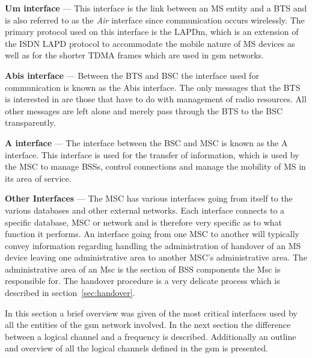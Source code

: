 \begin{description}
  \item{\textbf{Um interface}} --- This interface is the link between an \gls{MS} entity and a \gls{BTS} and is also referred to as the \emph{Air} interface since communication occurs wirelessly. The primary protocol used on this interface is the \gls{LAPDm}, which is an extension of the \gls{ISDN} LAPD protocol to accommodate the mobile nature of \gls{MS} devices as well as for the shorter \gls{TDMA} frames which are used in \gls{gsm} networks\cite{wirelesstelcoMullet,GSMSecurInTeleNetwork}.
\item{\textbf{Abis interface}} --- Between the \gls{BTS} and \gls{BSC} the interface used for communication is known as the Abis interface. The only messages that the \gls{BTS} is interested in are those that have to do with management of radio resources\cite{wirelesstelcoMullet,GSMSecurInTeleNetwork}. All other messages are left alone and merely pass through the \gls{BTS} to the \gls{BSC} transparently.
\item{\textbf{A interface}} --- The interface between the \gls{BSC} and \gls{MSC} is known as the A interface. This interface is used for the transfer of information, which is used by the \gls{MSC} to manage BSSs, control connections and manage the mobility of \gls{MS} in its area of service\cite{wirelesstelcoMullet,GSMArchitectureProtocolsServices}.
\item{\textbf{Other Interfaces}} --- The \gls{MSC} has various interfaces going from itself to the various databases and other external networks. Each interface connects to a specific database, \gls{MSC} or network and is therefore very specific as to what function it performs\cite{wirelesstelcoMullet,GSMArchitectureProtocolsServices}. An interface going from one \gls{MSC} to another will typically convey information regarding handling the administration of handover of an \gls{MS} device leaving one administrative area to another MSC's administrative area. The administrative area of an Msc is the section of \gls{BSS} components the Msc is responsible for. The handover procedure is a very delicate process which is described in section~\ref{sec:handover}.
\end{description}

In this section a brief overview was given of the most critical interfaces used by all the entities of the \gls{gsm} network involved. In the next section the difference between a logical channel and a frequency is described. Additionally an outline and overview of all the logical channels defined in the \gls{gsm} is presented. 
